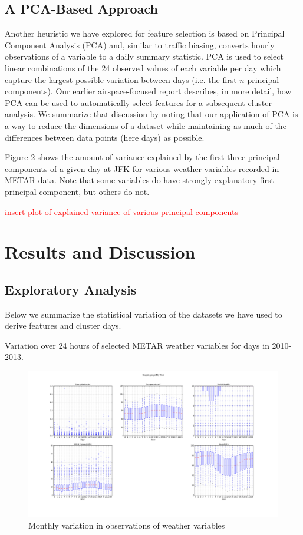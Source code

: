 \documentclass[11pt]{scrartcl}
\begin{document}
\subsection{A PCA-Based Approach}
Another heuristic we have explored for feature selection is based on Principal Component Analysis (PCA) and, similar to traffic biasing, converts hourly observations of a variable to a daily summary statistic.  PCA is used to select linear combinations of the 24 observed values of each variable per day which capture the largest possible variation between days (i.e. the first $n$ principal components).  Our earlier airspace-focused report describes, in more detail, how PCA can be used to automatically select features for a subsequent cluster analysis.  We summarize that discussion by noting that our application of PCA is a way to reduce the dimensions of a dataset while maintaining as much of the differences between data points (here days) as possible.

Figure 2 shows the amount of variance explained by the first three principal components of a given day at JFK for various weather variables recorded in METAR data.  Note that some variables do have strongly explanatory first principal component, but others do not.

\textcolor{red}{insert plot of explained variance of various principal components}

\newpage\noindent
\section{Results and Discussion}
\subsection{Exploratory Analysis}
Below we summarize the statistical variation of the datasets we have used to derive features and cluster days.  

Variation over 24 hours of selected METAR weather variables for days in 2010-2013.

\begin{figure}[htbp]
\begin{center}
\includegraphics[scale=0.25]{./figures/boxplot_hourlyvariation.png}
\caption{Monthly variation in observations of weather variables}
\label{default}
\end{center}
\end{figure}
\end{document}
